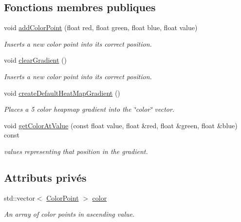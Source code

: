 \subsection*{Fonctions membres publiques}
\begin{DoxyCompactItemize}
\item 
void \hyperlink{class_color_gradient_a611f25f238e0781f27d2821971f4ac27}{add\+Color\+Point} (float red, float green, float blue, float value)
\begin{DoxyCompactList}\small\item\em Inserts a new color point into its correct position. \end{DoxyCompactList}\item 
\hypertarget{class_color_gradient_aeaa1447003e70159ab0bcd4197f80aa4}{}void \hyperlink{class_color_gradient_aeaa1447003e70159ab0bcd4197f80aa4}{clear\+Gradient} ()\label{class_color_gradient_aeaa1447003e70159ab0bcd4197f80aa4}

\begin{DoxyCompactList}\small\item\em Inserts a new color point into its correct position. \end{DoxyCompactList}\item 
\hypertarget{class_color_gradient_ae8e90e868e0904445061b9522d3764c4}{}void \hyperlink{class_color_gradient_ae8e90e868e0904445061b9522d3764c4}{create\+Default\+Heat\+Map\+Gradient} ()\label{class_color_gradient_ae8e90e868e0904445061b9522d3764c4}

\begin{DoxyCompactList}\small\item\em Places a 5 color heapmap gradient into the \char`\"{}color\char`\"{} vector. \end{DoxyCompactList}\item 
void \hyperlink{class_color_gradient_a2dfdd3a89831c4fa6cadd77dbf83cb04}{get\+Color\+At\+Value} (const float value, float \&red, float \&green, float \&blue) const 
\begin{DoxyCompactList}\small\item\em values representing that position in the gradient. \end{DoxyCompactList}\end{DoxyCompactItemize}
\subsection*{Attributs privés}
\begin{DoxyCompactItemize}
\item 
\hypertarget{class_color_gradient_a40b6c2f12b13e0855745b420ef2847de}{}std\+::vector$<$ \hyperlink{struct_color_gradient_1_1_color_point}{Color\+Point} $>$ \hyperlink{class_color_gradient_a40b6c2f12b13e0855745b420ef2847de}{color}\label{class_color_gradient_a40b6c2f12b13e0855745b420ef2847de}

\begin{DoxyCompactList}\small\item\em An array of color points in ascending value. \end{DoxyCompactList}\end{DoxyCompactItemize}


